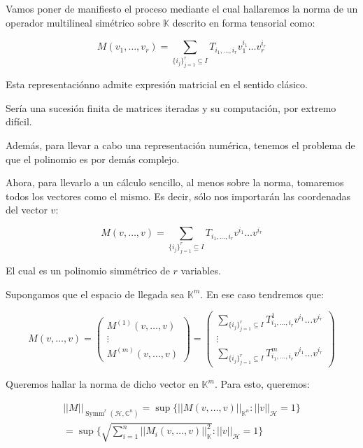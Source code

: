 \begin{rmrk}
	Vamos poner de manifiesto el proceso mediante el cual hallaremos la norma de un operador multilineal simétrico sobre $\mathbb{K}$ descrito en forma tensorial como: 
	
	\begin{equation*}
		M(v_1,\dots,v_r) = \sum_{\{i_j\}_{j = 1}^r \subseteq I} T_{i_1,\dots, i_r}v_1^{i_1} \dots  v_r^{i_r}
	\end{equation*} 
	
	
	Esta representaciónno admite expresión matricial en el sentido clásico.
	
	Sería una sucesión finita de matrices iteradas y su computación, por extremo difícil.
	
	Además, para llevar a cabo  una representación numérica, tenemos el problema de que el polinomio es por demás complejo.
	
	Ahora, para llevarlo a un cálculo sencillo, al menos sobre la norma, tomaremos todos los vectores como el mismo. Es decir, sólo nos importarán las coordenadas del vector $v$:
	
	\begin{equation*}
		M(v,\dots,v) = \sum_{\{i_j\}_{j = 1}^r \subseteq I} T_{i_1,\dots, i_r}v^{i_1} \dots  v^{i_r}
	\end{equation*} 
	
	El cual es un polinomio simmétrico de $r$ variables.
	
	Supongamos que el espacio de llegada sea $\mathbb{K}^m$. En ese caso tendremos que:
	
	\begin{equation*}
		M(v,\dots,v) =\begin{pmatrix}
			M^{(1)}(v,\dots,v)\\
			\vdots\\
			M^{(m)}(v,\dots,v)
		\end{pmatrix} =\begin{pmatrix}
			\displaystyle\sum_{\{i_j\}_{j = 1}^r \subseteq I} T^{1}_{i_1,\dots, i_r}v^{i_1} \dots  v^{i_r} \\
			\vdots    \\
			\displaystyle\sum_{\{i_j\}_{j = 1}^r \subseteq I} T^{m}_{i_1,\dots, i_r}v^{i_1} \dots  v^{i_r}
		\end{pmatrix}
	\end{equation*}
	
	Queremos hallar la norma de dicho vector en $\mathbb{K}^m$. Para esto, queremos:
	
	\begin{align*}
		||M||_{\operatorname{Symm}^r(\mathcal{H}, \mathbb{C}^n)} =  \sup \{||M(v,\dots,v)||_{\mathbb{K}^n} : ||v||_{\mathcal{H}} = 1 \}\\
		=  \sup \{\sqrt{\sum_{i =1}^n||M_i(v,\dots,v)||_{\mathbb{K}}^2} : ||v||_{\mathcal{H}} = 1 \}
	\end{align*}
	

\end{rmrk}
